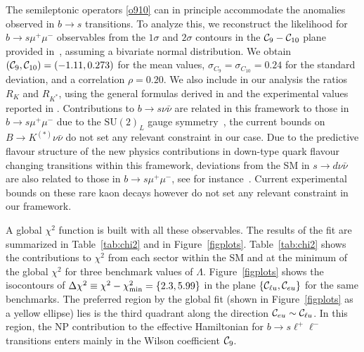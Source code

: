 \documentclass[aps,twocolumn,showpacs,preprintnumbers,amsmath,amssymb,floatfix,nofootinbib]{revtex4-1}
\newcommand{\C}{{\cal C}}
\begin{document}
The semileptonic operators \eqref{o910} can in principle accommodate the anomalies observed in $b \to s$ transitions.   To analyze this, we reconstruct the likelihood for $b \to s \mu^+ \mu^-$ observables from the $1 \sigma$ and $2 \sigma$ contours in the $\C_9-\C_{10}$ plane provided in~\cite{Altmannshofer:2017fio}, assuming a bivariate normal distribution.    We obtain $(\C_{9},\C_{10}) = (-1.11,0.273)$ for the mean values, $\sigma_{C_9} = \sigma_{C_{10}} = 0.24$ for the standard deviation, and a correlation $\rho = 0.20$.    We also include in our analysis the ratios $R_K$ and $R_{K^*}$, using the general formulas derived in \cite{Celis:2017doq} and the experimental values reported in \cite{LHCb:2014vgu,LHCb:2017avl}.       Contributions to $b \to s \nu \bar \nu$ are related in this framework to those in $b \to s \mu^+ \mu^-$ due to the $\mathrm{SU(2)}_L$ gauge symmetry~\cite{Buras:2014fpa}, the current bounds on $B \to K^{(*)} \nu \bar \nu$ do not set any relevant constraint in our case.  Due to the predictive flavour structure of the new physics contributions in down-type quark flavour changing transitions within this framework, deviations from the SM in $s \to d  \nu \bar \nu$ are also related to those in $b \to s \mu^+ \mu^-$, see for instance~\cite{Kamenik:2017tnu}.  Current experimental bounds on these rare kaon decays however do not set any relevant constraint in our framework.  

A global $\chi^2$ function is built with all these observables.  The results of the fit are summarized in Table~\ref{tab:chi2} and in Figure~\ref{figplots}.  Table~\ref{tab:chi2}  shows the contributions to $\chi^2$ from each sector within the SM and at the minimum of the global $\chi^2$ for three benchmark values of $\Lambda$.    Figure~\ref{figplots}  shows the isocontours of $\Delta \chi^2   \equiv \chi^2 - \chi^2_{\rm{min}}  = \{2.3,5.99\}$ in the plane $\{\C_{\ell u}, \C_{eu}\}$ for the same benchmarks.          The preferred region by the global fit (shown in Figure~\ref{figplots} as a yellow ellipse) lies is the third quadrant along the direction $\C_{eu} \sim \C_{\ell u}$.    In this region, the NP contribution to the effective Hamiltonian for $b \to s \ell^+ \ell^-$ transitions enters mainly in the Wilson coefficient $\C_9$. 
  
\end{document}
